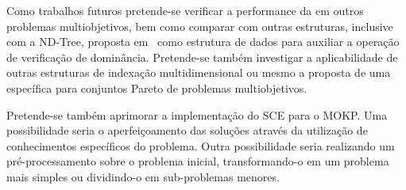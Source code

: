 Como trabalhos futuros pretende-se verificar a performance da \kdtree{} em outros problemas
multiobjetivos, bem como comparar com outras estruturas, inclusive com a ND-Tree, proposta
em~\cite{jaszkiewicz2017} como estrutura de dados para auxiliar a operação de verificação de dominância.
Pretende-se também investigar a aplicabilidade de outras estruturas de indexação
multidimensional ou mesmo a proposta de uma específica para conjuntos Pareto de problemas multiobjetivos.

Pretende-se também aprimorar a implementação do SCE para o MOKP.
Uma possibilidade seria o aperfeiçoamento das soluções
através da utilização de conhecimentos específicos do problema.
Outra possibilidade seria realizando um pré-processamento sobre o problema inicial,
transformando-o em um problema mais simples ou dividindo-o em sub-problemas
menores.



